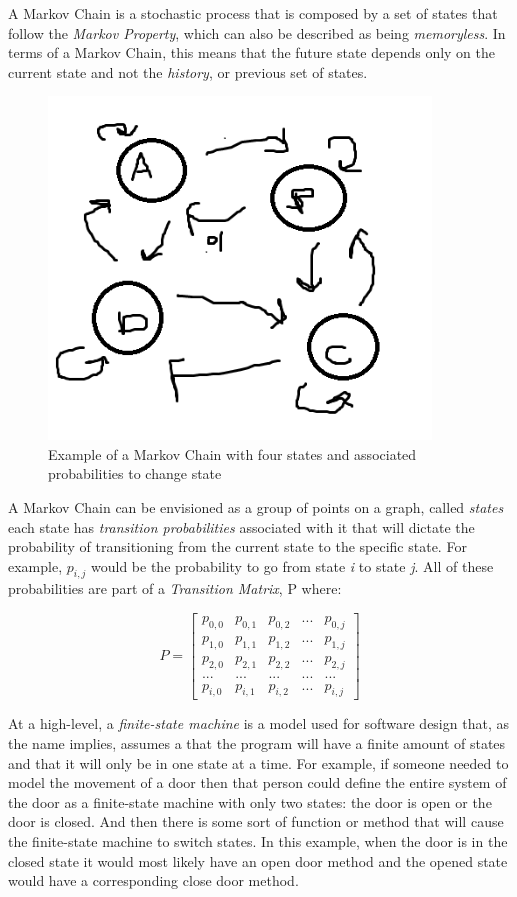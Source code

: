 \documentclass{article}
\begin{document}
A Markov Chain is a stochastic process that is composed by a set of states that follow the \textit{Markov Property}, which can also be described as being \textit{memoryless}.  In terms of a Markov Chain, this means that the future state depends only on the current state and not the \textit{history}, or previous set of states.

\begin{figure}
    \centering
    \includegraphics[width=4.0in]{betamarkovchain}
    \caption{Example of a Markov Chain with four states and associated probabilities to change state}
    \label{example_markov_chain}
\end{figure}

A Markov Chain can be envisioned as a group of points on a graph, called \textit{states} each state has \textit{transition probabilities} associated with it that will dictate the probability of transitioning from the current state to the specific state.  For example,  $p_{i,j}$ would be the probability to go from state \textit{i} to state \textit{j}.  All of these probabilities are part of a \textit{Transition Matrix}, P where:

$$
P=
\begin{bmatrix}
p_{0,0} & p_{0,1} & p_{0,2} & ... & p_{0,j}\\
p_{1,0} & p_{1,1} & p_{1,2} & ... & p_{1,j}\\
p_{2,0} & p_{2,1} & p_{2,2} & ... & p_{2,j}\\
... & ... & ... & ... & ...\\
p_{i,0} & p_{i,1} & p_{i,2} & ... & p_{i,j}
\end{bmatrix}
$$

At a high-level, a \textit{finite-state machine} is a model used for software design that, as the name implies, assumes a that the program will have a finite amount of states and that it will only be in one state at a time.  For example, if someone needed to model the movement of a door then that person could define the entire system of the door as a finite-state machine with only two states: the door is open or the door is closed.  And then there is some sort of function or method that will cause the finite-state machine to switch states.  In this example, when the door is in the closed state it would most likely have an open door method and the opened state would have a corresponding close door method.
\end{document}
